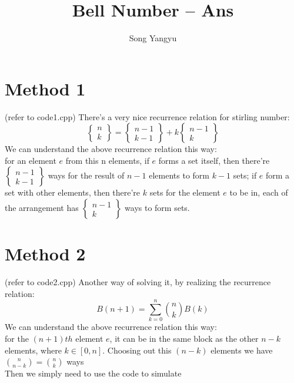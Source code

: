 \documentclass[14pt]{article}
\title{Bell Number -- Ans}
\author{Song Yangyu}
\def\stir#1#2{\left\{
\begin{array}{c}
#1\\#2
\end{array}
\right\}}
\begin{document}
\maketitle
\section *{Method 1}
(refer to code1.cpp)
There's a very nice recurrence relation for stirling number:\\
$$\stir{n}{k} = \stir{n-1}{k-1} + k\stir{n-1}{k} $$
We can understand the above recurrence relation this way:\\
for an element $e$ from this n elements, if $e$ forms a set itself, then there're $\stir{n-1}{k-1}$ ways for the result of $n-1$ elements to form $k-1$ sets; if $e$ form a set with other elements, then there're $k$ sets for the element $e$ to be in, each of the arrangement has $\stir{n-1}{k}$ ways to form sets.
\section *{Method 2}
(refer to code2.cpp)
Another way of solving it, by realizing the recurrence relation:
$$B(n+1) = \sum_{k=0}^{n} {n \choose k} B(k)$$
We can understand the above recurrence relation this way:\\
for the $(n+1)th$ element $e$, it can be in the same block as the other $n-k$ elements, where $k \in [0,n]$. Choosing out this $(n-k)$ elements we have ${n \choose {n-k}} = {n \choose k}$ ways
\\
Then we simply need to use the code to simulate
\end{document}
